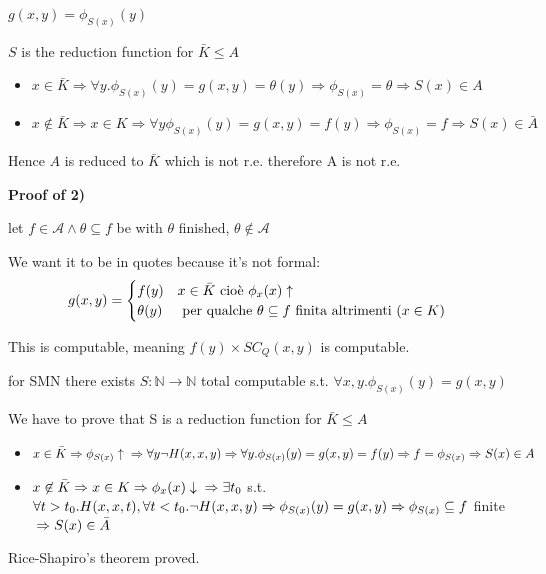 \documentclass{amsbook}
\newcommand{\nat}{\ensuremath{\mathbb{N}}}
\theoremstyle{definition}
\theoremstyle{remark}
\numberwithin{section}{chapter}
\numberwithin{equation}{chapter}
\begin{document}
$ g(x,y) = \phi_{S(x)}(y)$

$S$ is the reduction function for $ \bar{K}\leq A $

\begin{itemize}
	\item $ x\in\bar{K} \Rightarrow \forall y. \phi_{S(x)}(y) = g(x,y) = \theta(y) \Rightarrow \phi_{S(x)} = \theta \Rightarrow S(x) \in A $
	\item $ x\not\in\bar{K}\Rightarrow x\in K\Rightarrow\forall y\phi_{S(x)}(y) = g(x,y)=f(y)\Rightarrow\phi_{S(x)}=f\Rightarrow S(x)\in\bar{A}$
\end{itemize}

Hence $A$ is reduced to $ \bar{K} $ which is not r.e. therefore A is not r.e.

\textbf{Proof of 2)}

let $ f\in\mathcal{A}\land\theta\subseteq f $ be with $ \theta $ finished, $ \theta\not\in\mathcal{A} $

We want it to be in quotes because it's not formal: \begin{equation*}
	g(x,y) = \begin{cases}
		f(y)      & x \in\bar{K} $ cioè $ \phi_x(x)\uparrow                              \\
		\theta(y) & $ per qualche $ \theta\subseteq f $ finita altrimenti ($ x\in K $) $
	\end{cases}
\end{equation*}

This is computable, meaning $f(y) \times SC_Q(x,y) $ is computable.

for SMN there exists $ S:\nat\rightarrow\nat $ total computable s.t. $ \forall x,y. \phi_{S(x)}(y) = g(x,y) $

We have to prove that S is a reduction function for $ \bar{K}\leq A $

\begin{itemize}
	\item $ x\in\bar{K}\\
		      \Rightarrow\phi_{S(x)}\uparrow \\
		      \Rightarrow\forall y\lnot H(x,x,y)\\
		      \Rightarrow \forall y.\phi_{S(x)}(y) = g(x,y) = f(y)\\
		      \Rightarrow f = \phi_{S(x)}\\ \Rightarrow S(x)\in A$
	\item $ x\not\in\bar{K}\\ \Rightarrow x\in K\\
		      \Rightarrow \phi_x(x)\downarrow\\
		      \Rightarrow \exists t_0 $ s.t. $ \forall t>t_0. H(x,x,t), \forall t<t_0. \lnot H(x,x,y)\\
		      \Rightarrow\phi_{S(x)}(y) = g(x,y)\\
		      \Rightarrow \phi_{S(x)}\subseteq f$ finite $\\
		      \Rightarrow S(x) \in \bar{A} $
\end{itemize}

Rice-Shapiro's theorem proved.
\end{document}
